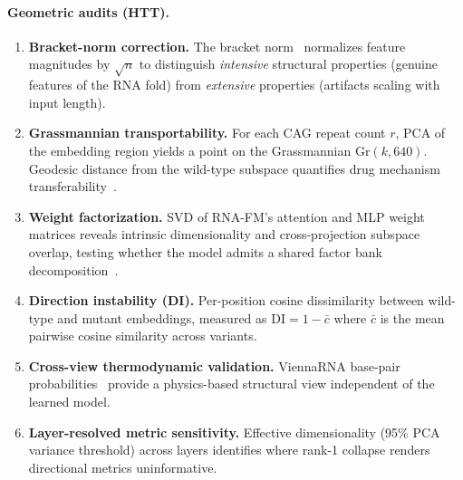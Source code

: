 \documentclass[11pt]{article}
\newcommand{\Gr}{\mathrm{Gr}}
\begin{document}
\paragraph{Geometric audits (HTT).}
\begin{enumerate}
\item \textbf{Bracket-norm correction.} The bracket
  norm~\citep{tower2026bn} normalizes feature magnitudes by $\sqrt{n}$
  to distinguish \emph{intensive} structural properties (genuine
  features of the RNA fold) from \emph{extensive} properties (artifacts
  scaling with input length).

\item \textbf{Grassmannian transportability.} For each CAG repeat count
  $r$, PCA of the embedding region yields a point on the Grassmannian
  $\Gr(k, 640)$. Geodesic distance from the wild-type subspace
  quantifies drug mechanism
  transferability~\citep{tower2026grass}.

\item \textbf{Weight factorization.} SVD of RNA-FM's attention and MLP
  weight matrices reveals intrinsic dimensionality and cross-projection
  subspace overlap, testing whether the model admits a shared factor
  bank decomposition~\citep{tower2026fac}.

\item \textbf{Direction instability (DI).} Per-position cosine
  dissimilarity between wild-type and mutant embeddings, measured as
  $\mathrm{DI} = 1 - \bar{c}$ where $\bar{c}$ is the mean pairwise
  cosine similarity across variants.

\item \textbf{Cross-view thermodynamic validation.} ViennaRNA
  base-pair probabilities~\citep{lorenz2011viennarna} provide a
  physics-based structural view independent of the learned model.

\item \textbf{Layer-resolved metric sensitivity.} Effective
  dimensionality (95\% PCA variance threshold) across layers identifies
  where rank-1 collapse renders directional metrics uninformative.
\end{enumerate}
\end{document}
